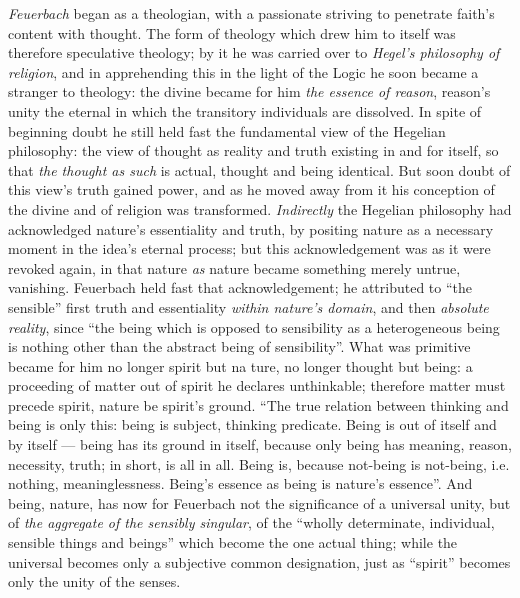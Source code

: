 \documentclass[12pt,a4paper]{book}
\begin{document}
\emph{Feuerbach} began as a theologian, with a passionate striving to
penetrate faith's content with thought. The form of theology which drew him to
itself was therefore speculative theology; by it he was carried over to
\emph{Hegel's philosophy of religion}, and in apprehending this in the light
of the Logic he soon became a stranger to theology: the divine became for him
\emph{the essence of reason}, reason's unity the eternal in which the
transitory individuals are dissolved. In spite of beginning doubt he still
held fast the fundamental view of the Hegelian philosophy: the view of thought
as reality and truth existing in and for itself, so that \emph{the thought as
such} is actual, thought and being identical. But soon doubt of this view's
truth gained power, and as he moved away from it his conception of the divine
and of religion was transformed. \emph{Indirectly} the Hegelian philosophy had
acknowledged nature's essentiality and truth, by positing nature as a
necessary moment in the idea's eternal process; but this acknowledgement was
as it were revoked again, in that nature \emph{as} nature became something
merely untrue, vanishing. Feuerbach held fast that acknowledgement; he
attributed to ``the sensible'' first truth and essentiality \emph{within
nature's domain}, and then \emph{absolute reality}, since ``the being which is
opposed to sensibility as a heterogeneous being is nothing other than the
abstract being of sensibility''. What was primitive became for him no longer
spirit but na\-%
ture, no longer thought but being: a proceeding of matter out of spirit he
declares unthinkable; therefore matter must precede spirit, nature be spirit's
ground. ``The true relation between thinking and being is only this: being is
subject, thinking predicate. Being is out of itself and by itself --- being
has its ground in itself, because only being has meaning, reason, necessity,
truth; in short, is all in all. Being is, because not-being is not-being, i.e.
nothing, meaninglessness. Being's essence as being is nature's essence''. And
being, nature, has now for Feuerbach not the significance of a universal
unity, but of \emph{the aggregate of the sensibly singular}, of the ``wholly
determinate, individual, sensible things and beings'' which become the one
actual thing; while the universal becomes only a subjective common
designation, just as ``spirit'' becomes only the unity of the senses.
\end{document}
